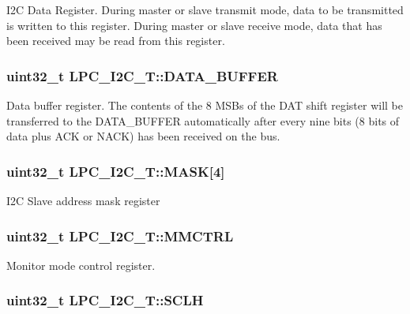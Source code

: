 I2\-C Data Register. During master or slave transmit mode, data to be transmitted is written to this register. During master or slave receive mode, data that has been received may be read from this register. \hypertarget{structLPC__I2C__T_a63283a528320f69703f42fcc919ab4bc}{
\subsubsection[{D\-A\-T\-A\-\_\-\-B\-U\-F\-F\-E\-R}]{ uint32\-\_\-t L\-P\-C\-\_\-\-I2\-C\-\_\-\-T\-::\-D\-A\-T\-A\-\_\-\-B\-U\-F\-F\-E\-R}}\label{structLPC__I2C__T_a63283a528320f69703f42fcc919ab4bc}
Data buffer register. The contents of the 8 M\-S\-Bs of the D\-A\-T shift register will be transferred to the D\-A\-T\-A\-\_\-\-B\-U\-F\-F\-E\-R automatically after every nine bits (8 bits of data plus A\-C\-K or N\-A\-C\-K) has been received on the bus. \hypertarget{structLPC__I2C__T_a9e734d7a24b7a02ac1887608552b9c69}{
\subsubsection[{M\-A\-S\-K}]{ uint32\-\_\-t L\-P\-C\-\_\-\-I2\-C\-\_\-\-T\-::\-M\-A\-S\-K\mbox{[}4\mbox{]}}}\label{structLPC__I2C__T_a9e734d7a24b7a02ac1887608552b9c69}
I2\-C Slave address mask register \hypertarget{structLPC__I2C__T_ace2d21c2a5042f1355f98b2e687ae8c1}{
\subsubsection[{M\-M\-C\-T\-R\-L}]{ uint32\-\_\-t L\-P\-C\-\_\-\-I2\-C\-\_\-\-T\-::\-M\-M\-C\-T\-R\-L}}\label{structLPC__I2C__T_ace2d21c2a5042f1355f98b2e687ae8c1}
Monitor mode control register. \hypertarget{structLPC__I2C__T_a73be20e257e178ea0deafd0057cc7900}{
\subsubsection[{S\-C\-L\-H}]{ uint32\-\_\-t L\-P\-C\-\_\-\-I2\-C\-\_\-\-T\-::\-S\-C\-L\-H}}\label{structLPC__I2C__T_a73be20e257e178ea0deafd0057cc7900}
